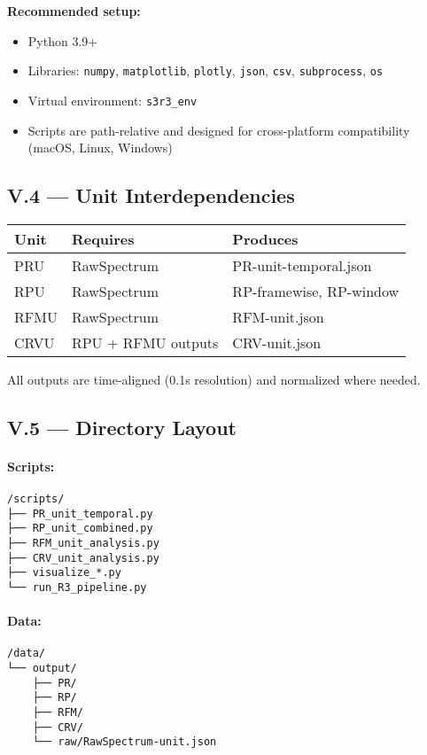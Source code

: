 \documentclass{article}
\begin{document}
\textbf{Recommended setup:}

\begin{itemize}
    \item Python 3.9+
    \item Libraries: \texttt{numpy}, \texttt{matplotlib}, \texttt{plotly}, \texttt{json}, \texttt{csv}, \texttt{subprocess}, \texttt{os}
    \item Virtual environment: \texttt{s3r3\_env}
    \item Scripts are path-relative and designed for cross-platform compatibility (macOS, Linux, Windows)
\end{itemize}

\subsection*{V.4 — Unit Interdependencies}

\begin{center}
\begin{tabular}{|l|l|l|}
\hline
\textbf{Unit} & \textbf{Requires} & \textbf{Produces} \\
\hline
PRU & RawSpectrum & PR-unit-temporal.json \\
RPU & RawSpectrum & RP-framewise, RP-window \\
RFMU & RawSpectrum & RFM-unit.json \\
CRVU & RPU + RFMU outputs & CRV-unit.json \\
\hline
\end{tabular}
\end{center}

All outputs are time-aligned (0.1s resolution) and normalized where needed.

\subsection*{V.5 — Directory Layout}

\paragraph{Scripts:}
\begin{verbatim}
/scripts/
├── PR_unit_temporal.py
├── RP_unit_combined.py
├── RFM_unit_analysis.py
├── CRV_unit_analysis.py
├── visualize_*.py
└── run_R3_pipeline.py
\end{verbatim}

\paragraph{Data:}
\begin{verbatim}
/data/
└── output/
    ├── PR/
    ├── RP/
    ├── RFM/
    ├── CRV/
    └── raw/RawSpectrum-unit.json
\end{verbatim}
\end{document}
